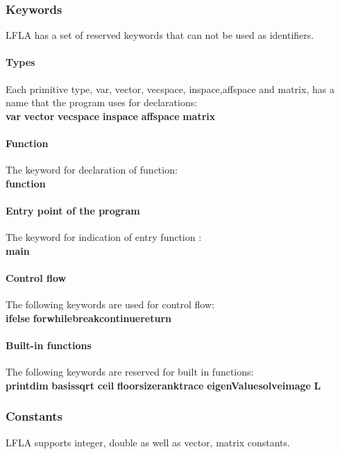 \documentclass[12pt]{article} %
\begin{document}
\subsubsection{Keywords}
LFLA has a set of reserved keywords that can not be used as identifiers.
\paragraph{Types} Each primitive type, var, vector, vecspace, inspace,affspace and matrix, has a name that the program
uses for declarations:\\
 \textbf{var}  \quad  \textbf{vector}  \quad\textbf{vecspace} \quad\textbf{ inspace} \quad \textbf{affspace} \quad \textbf{matrix}
 \paragraph{Function}The keyword for declaration of  function:\\
\textbf{function}
\paragraph{Entry point of the program}  The keyword  for indication of  entry function :\\ 
\textbf{main}
\paragraph{Control flow}The following keywords are used for control flow:\\
 \textbf{if}\quad \textbf{else} \quad\textbf{for}\quad\textbf{while}\quad\textbf{break}\quad\textbf{continue}\quad\textbf{return}

\paragraph{Built-in functions} The following keywords are reserved for built in functions:\\
\textbf{print}\quad \textbf{dim} \quad \textbf{basis}\quad \textbf{sqrt} \quad \textbf{ceil} \quad \textbf{floor}\quad \textbf{size}\quad \textbf{rank}\quad \textbf{trace}
\quad\textbf{eigenValue}\quad\textbf{solve}\quad \textbf{image} \quad\textbf{L} 

\subsubsection{Constants}
LFLA supports integer, double as well as vector, matrix constants.   
\end{document}
